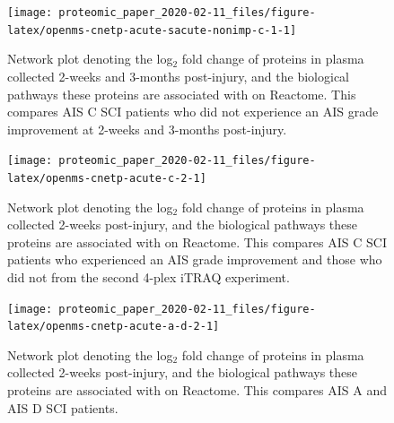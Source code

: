 \documentclass[9pt,lineno]{elife}
\newcommand{\blandscape}{\begin{landscape}}
\newcommand{\elandscape}{\end{landscape}}
\begin{document}
\begin{landscape}
\begin{landscape}
\begin{landscape}
\begin{landscape}
\begin{figure}

{\centering \texttt{[image: proteomic\_paper\_2020-02-11\_files/figure-latex/openms-cnetp-acute-sacute-nonimp-c-1-1]} 

}

\caption[Network plot - iTRAQ - Acute C Non-Improvers VS Subacute Non-Improvers]{Network plot denoting the log\(_2\) fold change of proteins in plasma collected 2-weeks and 3-months post-injury, and the biological pathways these proteins are associated with on Reactome. This compares AIS C SCI patients who did not experience an AIS grade improvement at 2-weeks and 3-months post-injury.}\label{fig:openms-cnetp-acute-sacute-nonimp-c-1}
\end{figure}

\elandscape
\blandscape



\begin{figure}

{\centering \texttt{[image: proteomic\_paper\_2020-02-11\_files/figure-latex/openms-cnetp-acute-c-2-1]} 

}

\caption[Network plot - iTRAQ - Acute C Improvers VS Non-Improvers]{Network plot denoting the log\(_2\) fold change of proteins in plasma collected 2-weeks post-injury, and the biological pathways these proteins are associated with on Reactome. This compares AIS C SCI patients who experienced an AIS grade improvement and those who did not from the second 4-plex iTRAQ experiment.}\label{fig:openms-cnetp-acute-c-2}
\end{figure}

\elandscape
\blandscape



\begin{figure}

{\centering \texttt{[image: proteomic\_paper\_2020-02-11\_files/figure-latex/openms-cnetp-acute-a-d-2-1]} 

}

\caption[Network plot - iTRAQ - Acute A VS Acute D]{Network plot denoting the log\(_2\) fold change of proteins in plasma collected 2-weeks post-injury, and the biological pathways these proteins are associated with on Reactome. This compares AIS A and AIS D SCI patients.}\label{fig:openms-cnetp-acute-a-d-2}
\end{figure}

\elandscape
\blandscape




\end{landscape}
\end{landscape}
\end{landscape}
\end{landscape}
\end{document}
